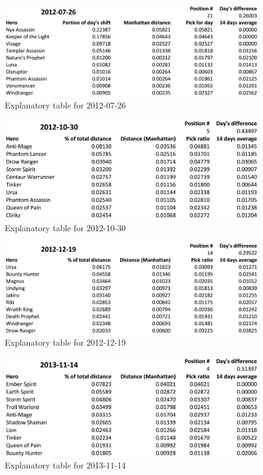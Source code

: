\begin{figure}[H]
    \centering
    \caption{Explanatory table for 2012-07-26}
    \label{fig:20120726}
    \includegraphics[width=1\textwidth]{20120726.png}
\end{figure}

\begin{figure}[H]
    \centering
    \caption{Explanatory table for 2012-10-30}
    \label{fig:20121030}
    \includegraphics[width=1\textwidth]{20121030.png}
\end{figure}

\begin{figure}[H]
    \centering
    \caption{Explanatory table for 2012-12-19}
    \label{fig:20121219}
    \includegraphics[width=1\textwidth]{20121219.png}
\end{figure}

\begin{figure}[H]
    \centering
    \caption{Explanatory table for 2013-11-14}
    \label{fig:20131114}
    \includegraphics[width=1\textwidth]{20131114.png}
\end{figure}

